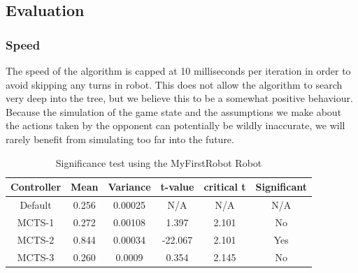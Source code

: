 \subsection{Evaluation}

\subsubsection{Speed}
The speed of the algorithm is capped at 10 milliseconds per iteration in order to avoid skipping any turns in robot. This does not allow the algorithm to search very deep into the tree, but we believe this to be a somewhat positive behaviour. Because the simulation of the game state and the assumptions we make about the actions taken by the opponent can potentially be wildly inaccurate, we will rarely benefit from simulating too far into the future.

\begin{table}
\begin{center}
\renewcommand{\arraystretch}{1}
\caption{Significance test using the MyFirstRobot Robot}
\label{table-MFS-significance}
\begin{tabular}{|c | c | c |c | c | c |}
\hline
Controller & Mean & Variance & t-value & critical t & Significant\\
\hline
Default & 0.256 & 0.00025 & N/A & N/A & N/A\\
\hline
MCTS-1 & 0.272 & 0.00108 & 1.397 & 2.101 & No\\
\hline
MCTS-2 & 0.844 & 0.00034 & -22.067 & 2.101 & Yes\\
\hline
MCTS-3 & 0.260 & 0.0009 & 0.354 & 2.145 & No\\
\hline
\end{tabular}
\end{center}
\end{table}


